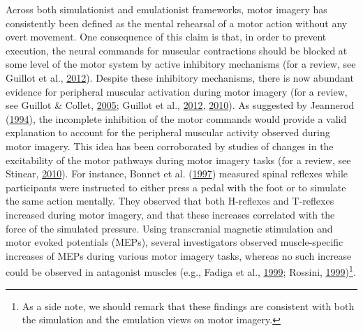 \documentclass[a4paper,12pt,twoside,openright,oldfontcommands]{memoir}
\let\rmarkdownfootnote\footnote%
\def\footnote{\protect\rmarkdownfootnote}
\begin{document}
Across both simulationist and emulationist frameworks, motor imagery has consistently been defined as the mental rehearsal of a motor action without any overt movement. One consequence of this claim is that, in order to prevent execution, the neural commands for muscular contractions should be blocked at some level of the motor system by active inhibitory mechanisms (for a review, see Guillot et al., \protect\hyperlink{ref-guillot_imagining_2012}{2012}). Despite these inhibitory mechanisms, there is now abundant evidence for peripheral muscular activation during motor imagery (for a review, see Guillot \& Collet, \protect\hyperlink{ref-guillot_contribution_2005}{2005}; Guillot et al., \protect\hyperlink{ref-guillot_imagining_2012}{2012}, \protect\hyperlink{ref-guillot_electromyographic_2010}{2010}). As suggested by Jeannerod (\protect\hyperlink{ref-jeannerod_representing_1994}{1994}), the incomplete inhibition of the motor commands would provide a valid explanation to account for the peripheral muscular activity observed during motor imagery. This idea has been corroborated by studies of changes in the excitability of the motor pathways during motor imagery tasks (for a review, see Stinear, \protect\hyperlink{ref-stinear_corticospinal_2010}{2010}). For instance, Bonnet et al. (\protect\hyperlink{ref-bonnet_mental_1997}{1997}) measured spinal reflexes while participants were instructed to either press a pedal with the foot or to simulate the same action mentally. They observed that both H-reflexes and T-reflexes increased during motor imagery, and that these increases correlated with the force of the simulated pressure. Using transcranial magnetic stimulation and motor evoked potentials (MEPs), several investigators observed muscle-specific increases of MEPs during various motor imagery tasks, whereas no such increase could be observed in antagonist muscles (e.g., Fadiga et al., \protect\hyperlink{ref-fadiga_corticospinal_1999}{1999}; Rossini, \protect\hyperlink{ref-rossini_corticospinal_1999}{1999})\footnote{As a side note, we should remark that these findings are consistent with both the simulation and the emulation views on motor imagery.}.
\end{document}

